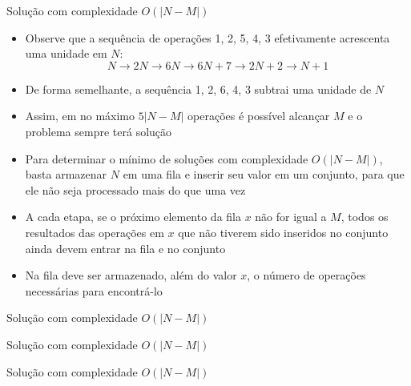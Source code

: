 \begin{frame}[fragile]{Solução com complexidade $O(|N - M|)$}

    \begin{itemize}
        \item Observe que a sequência de operações 1, 2, 5, 4, 3 efetivamente acrescenta 
            uma unidade em $N$:
            \[
                N \to 2N \to 6N \to 6N + 7 \to 2N + 2 \to N + 1
            \]

        \item De forma semelhante, a sequência 1, 2, 6, 4, 3 subtrai uma unidade de $N$

        \item Assim, em no máximo $5|N - M|$ operações é possível alcançar $M$ e o problema sempre 
            terá solução

        \item Para determinar o mínimo de soluções com complexidade $O(|N - M|)$, basta armazenar
            $N$ em uma fila e inserir seu valor em um conjunto, para que ele não seja processado
            mais do que uma vez

        \item A cada etapa, se o próximo elemento da fila $x$ não for igual a $M$, todos os 
            resultados
            das operações em $x$ que não tiverem sido inseridos no conjunto ainda devem
            entrar na fila e no conjunto

        \item Na fila deve ser armazenado, além do valor $x$, o número de operações necessárias
            para encontrá-lo

   \end{itemize}

\end{frame}

\begin{frame}[fragile]{Solução com complexidade $O(|N - M|)$}
\end{frame}

\begin{frame}[fragile]{Solução com complexidade $O(|N - M|)$}
\end{frame}

\begin{frame}[fragile]{Solução com complexidade $O(|N - M|)$}
\end{frame}
